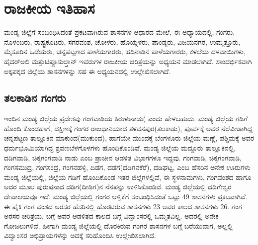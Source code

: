 
\chapter{ರಾಜಕೀಯ ಇತಿಹಾಸ}

ಮಂಡ್ಯ ಜಿಲ್ಲೆಗೆ ಸಂಬಂಧಿಸಿದಂತೆ ಪ್ರಕಟವಾಗಿರುವ ಶಾಸನಗಳ ಆಧಾರದ ಮೇಲೆ, ಈ ಅಧ್ಯಾಯದಲ್ಲಿ, ಗಂಗರು, ನೊಳಂಬರು, ರಾಷ್ಟ್ರಕೂಟರು, ಸಗರವಂಶ, ಚೋಳರು, ಹೊಯ್ಸಳರು, ಪಾಂಡ್ಯರು, ವಿಜಯನಗರ, ಉಮ್ಮತ್ತೂರು, ಮೈಸೂರಿನ ಒಡೆಯರು, ಚನ್ನಪಟ್ಟಣದ ಪಾಳೆಯಗಾರರು, ಹದಿನಾಡಿನ ಪಾಳೆಯಗಾರರು, ಕಳಲೆಯ ದಳವಾಯಿಗಳು, ಹೈದರ್​ಅಲಿ ಮತ್ತು\break ಟಿಪ್ಪೂಸುಲ್ತಾನ್​ ಇವರುಗಳ ರಾಜಕೀಯ ಚರಿತ್ರೆಯನ್ನು ಅಧ್ಯಯನ ಮಾಡಲಾಗಿದೆ. ಸಾಂದರ್ಭಿಕವಾಗಿ ಅಕ್ಕಪಕ್ಕದ ಜಿಲ್ಲೆಯ ಶಾಸನಗಳನ್ನು ಸಹ ಈ ಅಧ್ಯಯನದಲ್ಲಿ ಉಲ್ಲೇಖಿಸಲಾಗಿದೆ.

\section{ತಲಕಾಡಿನ ಗಂಗರು}

ಇಂದಿನ ಮಂಡ್ಯ ಜಿಲ್ಲೆಯ ಪ್ರದೇಶವು ಗಂಗವಾಡಿಯ ತಿರುಳುನಾಡು( ಎಂದು ಹೇಳಬಹುದು. ಮಂಡ್ಯ ಜಿಲ್ಲೆಯ ಗಡಿಗೆ ಹೊಂದಿ ಕೊಂಡಹಾಗೆ, ದಕ್ಷಿಣಕ್ಕೆ ಗಂಗರ ರಾಜಧಾನಿಯಾದ ತಳವನಪುರ(ತಲಕಾಡು), ಪೂರ್ವಕ್ಕೆ ಅವರ ನೆಲೆವೀಡಾಗಿದ್ದ ಚನ್ನಪಟ್ಟಣ ತಾಲ್ಲೂಕಿನ ಮಾಕುಂದ(ಮುಕುಂದ), ಹಾಗೆಯೇ ಮುಂದಕ್ಕೆ ಬೆಂಗಳೂರು ಜಿಲ್ಲೆಯ ಮಣ್ಣೆ, ಪಶ್ಚಿಮಕ್ಕೆ ಅವರ ಧರ್ಮಭೂಮಿಯಾಗಿದ್ದ ಶ್ರವಣಬೆಳಗೊಳಗಳು ಹೊಂದಿಕೊಂಡಿವೆ. ಮಂಡ್ಯ ಜಿಲ್ಲೆಯ ಮದ್ದೂರು ತಾಲ್ಲೂಕಿನಲ್ಲಿ, ದಡಿಗವಾಡಿ, ಚಿಕ್ಕಗಂಗವಾಡಿ ನಾಡು ಎಂಬ ಪ್ರಾಚೀನ ಆಡಳಿತ ವಿಭಾಗಗಳೂ ಇದ್ದವು. ಗಂಗವಾಡಿ, ಚಿಕ್ಕಗಂಗವಾಡಿ, ಗಂಗಸಮುದ್ರ, ಗಂಗಸಂದ್ರ, ಗಂಗನಹಳ್ಳಿ, ದಿಡಗ, ದಡಗ(ದಡಿಗನಕೆರೆ), ದಡಿಘಟ್ಟ, ಎಂಬ ಹೆಸರಿನ ಅನೇಕ ಊರುಗಳು ಮಂಡ್ಯ ಜಿಲ್ಲೆಯಲ್ಲಿ, ಜಿಲ್ಲೆಯ ಗಡಿಗೆ ಹೊಂದಿಕೊಂಡ ಇತರ ಜಿಲ್ಲೆಗಳಲ್ಲಿವೆ, ಈ ಸ್ಥಳನಾಮಗಳು, ಗಂಗವಂಶದ ಹಾಗೂ ಅದರ ಮೂಲ ಪುರುಷನಾದ ದಡಿಗ(ದೀಡಿಗ)ನ ನೆನಪನ್ನು ಉಳಿಸಿಕೊಂಡಿವೆ. ಮಂಡ್ಯ ಜಿಲ್ಲೆಯಲ್ಲಿ ದಡಿಗೇಶ್ವರ ದೇವಾಲಯವೂ ಇದೆ. ಮಂಡ್ಯ ಜಿಲ್ಲೆಯಲ್ಲಿ ಗಂಗರ ಆಳ್ವಿಕೆಗೆ ಸಂಬಂಧಿಸಿದಂತೆ ಒಟ್ಟು 49 ಶಾಸನಗಳು ಪ್ರಕಟವಾಗಿವೆ. ಈ ಪೈಕಿ ಗಂಗ ವಂಶದ ಅರಸರ ಹೆಸರಿನಲ್ಲಿ ಹೊರಟಿರುವ ಶಾಸನಗಳು 23 ಅವರ ಕಾಲದ ಶಾಸನಗಳು 26. ಗಂಗ ಅರಸರ ಚರಿತ್ರೆಯ, ಬಗ್ಗೆ ಅವರ ಆಡಳಿತದ ಕಾಲದ ಬಗ್ಗೆ ವಿದ್ವಾಂಸರಲ್ಲಿ ಒಮ್ಮತವಿಲ್ಲ. ಅದರಲ್ಲಿ ಅನೇಕ ಗೋಜಲುಗಳಿವೆ. ಹೀಗಾಗಿ ಮಂಡ್ಯ ಜಿಲ್ಲೆಯಲ್ಲಿ ದೊರಕಿರುವ ಗಂಗರ ಶಾಸನಗಳ ಬಗ್ಗೆ ಬರೆಯುವಾಗ, ಅಲ್ಲಲ್ಲಿ ವಿದ್ವಾಂಸರ ಅಭಿಪ್ರಾಯಗಳನ್ನು ಅದಕ್ಕೆ ಸರಿಹೊಂದಿಸಿ ಉಲ್ಲೇಖಿಸಲಾಗಿದೆ.


